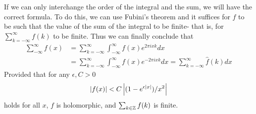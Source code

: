 \documentclass{homework}
\begin{document}
\begin{solution}
                                                                                  If we can only interchange the order of the integral and the sum, we will have the correct formula. To do this, we can use Fubini's theorem and it suffices for $f$ to be such that the value of the sum of the integral to be finite- that is, for $\sum_{k=-\infty}^\infty f(k)$ to be finite. Thus we can finally conclude that
                                                                                  \begin{align*}
                                                                                  \sum_{-\infty} ^ \infty f(x) &=  \sum_{k=-\infty}^{\infty}\int_{-\infty}^\infty f(x)e^{2\pi i xk} dx\\
                                                                                  &=  \sum_{k=-\infty}^{\infty}\int_{-\infty}^\infty f(x)e^{-2\pi i xk} dx = \sum_{k=-\infty}^\infty \hat f(k)dx
                                                                                  \end{align*}
                                                                                  Provided that for any $\epsilon,C>0$
                                                                                  \[\left|f(x)\right| <  C\left|(1-e^{\epsilon\left|x\right|})/x^2\right|\] 
                                                                                  holds for all $x$, $f$ is holomorphic, and $\sum_{k\in \mathbb{Z}} f(k)$ is finite.
                                                                                  \end{solution}
\end{document}
